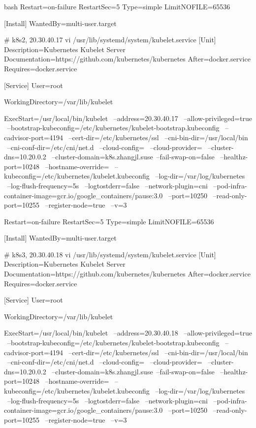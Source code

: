 \begin{outline}[enumerate]
\begin{code-in-enumerate}{bash}
Restart=on-failure
RestartSec=5
Type=simple
LimitNOFILE=65536

[Install]
WantedBy=multi-user.target

# k8s2, 20.30.40.17
vi /usr/lib/systemd/system/kubelet.service
[Unit]
Description=Kubernetes Kubelet Server
Documentation=https://github.com/kubernetes/kubernetes
After=docker.service
Requires=docker.service

[Service]
User=root

WorkingDirectory=/var/lib/kubelet

ExecStart=/usr/local/bin/kubelet \
    --address=20.30.40.17 \
    --allow-privileged=true \
    --bootstrap-kubeconfig=/etc/kubernetes/kubelet-bootstrap.kubeconfig \
    --cadvisor-port=4194 \
    --cert-dir=/etc/kubernetes/ssl \
    --cni-bin-dir=/usr/local/bin \
    --cni-conf-dir=/etc/cni/net.d \
    --cloud-config= \
    --cloud-provider= \
    --cluster-dns=10.20.0.2 \
    --cluster-domain=k8s.zhangjl.suse\
    --fail-swap-on=false \
    --healthz-port=10248 \
    --hostname-override= \
    --kubeconfig=/etc/kubernetes/kubelet.kubeconfig \
    --log-dir=/var/log/kubernetes \
    --log-flush-frequency=5s \
    --logtostderr=false \
    --network-plugin=cni \
    --pod-infra-container-image=gcr.io/google_containers/pause:3.0 \
    --port=10250 \
    --read-only-port=10255 \
    --register-node=true \
    --v=3

Restart=on-failure
RestartSec=5
Type=simple
LimitNOFILE=65536

[Install]
WantedBy=multi-user.target

# k8s3, 20.30.40.18
vi /usr/lib/systemd/system/kubelet.service
[Unit]
Description=Kubernetes Kubelet Server
Documentation=https://github.com/kubernetes/kubernetes
After=docker.service
Requires=docker.service

[Service]
User=root

WorkingDirectory=/var/lib/kubelet

ExecStart=/usr/local/bin/kubelet \
    --address=20.30.40.18 \
    --allow-privileged=true \
    --bootstrap-kubeconfig=/etc/kubernetes/kubelet-bootstrap.kubeconfig \
    --cadvisor-port=4194 \
    --cert-dir=/etc/kubernetes/ssl \
    --cni-bin-dir=/usr/local/bin \
    --cni-conf-dir=/etc/cni/net.d \
    --cloud-config= \
    --cloud-provider= \
    --cluster-dns=10.20.0.2 \
    --cluster-domain=k8s.zhangjl.suse\
    --fail-swap-on=false \
    --healthz-port=10248 \
    --hostname-override= \
    --kubeconfig=/etc/kubernetes/kubelet.kubeconfig \
    --log-dir=/var/log/kubernetes \
    --log-flush-frequency=5s \
    --logtostderr=false \
    --network-plugin=cni \
    --pod-infra-container-image=gcr.io/google_containers/pause:3.0 \
    --port=10250 \
    --read-only-port=10255 \
    --register-node=true \
    --v=3


\end{code-in-enumerate}
\end{outline}
